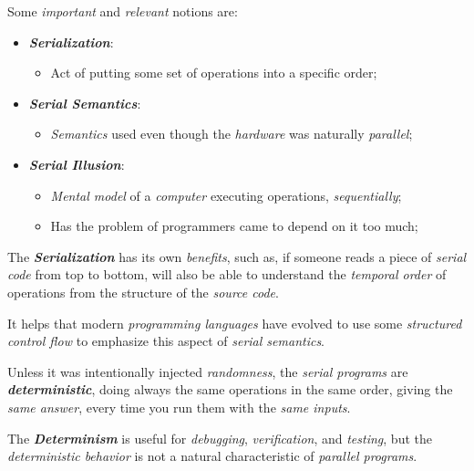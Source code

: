 \noindent Some \emph{important} and \emph{relevant} notions are:
\begin{itemize}
    \vspace{-0.2cm}
    \item \textbf{\emph{Serialization}}:
    \vspace{-0.2cm}
    \begin{itemize}
        \item Act of putting some set of operations into a specific order; 
    \end{itemize}
    \vspace{-0.2cm}
    \item \textbf{\emph{Serial Semantics}}:
    \vspace{-0.2cm}
    \begin{itemize}
        \item \emph{Semantics} used even though the \emph{hardware} was naturally \emph{parallel}; 
    \end{itemize}
    \vspace{-0.2cm}
    \item \textbf{\emph{Serial Illusion}}:
    \vspace{-0.2cm}
    \begin{itemize}
        \item \emph{Mental model} of a \emph{computer} executing operations, \emph{sequentially};
        \item Has the problem of programmers came to depend on it too much;
    \end{itemize}
\end{itemize}

\noindent The \textbf{\textit{Serialization}} has its own \emph{benefits}, such as, if someone reads a piece of \emph{serial code} from top to bottom, will also be able to understand the \emph{temporal order} of operations from the structure of the \emph{source code}.

It helps that modern \emph{programming languages} have evolved to use some \emph{structured} \emph{control flow} to emphasize this aspect of \emph{serial semantics}.

Unless it was intentionally injected \emph{randomness}, the \emph{serial programs} are \textbf{\emph{deterministic}}, doing always the same operations in the same order, giving the \emph{same answer}, every time you run them with the \emph{same inputs}.

The \textbf{\emph{Determinism}} is useful for \emph{debugging}, \emph{verification}, and \emph{testing}, but the \emph{deterministic behavior} is not a natural characteristic of \emph{parallel programs}.


